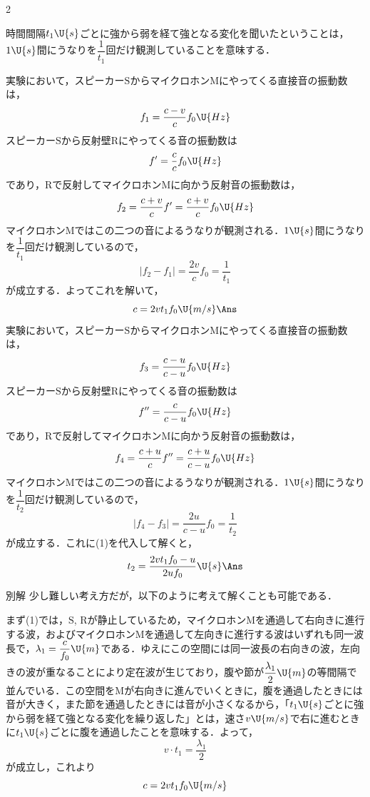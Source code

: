 \begin{multicols}{2}
\begin{sisin}
時間間隔$t_1\U{s}$ごとに強から弱を経て強となる変化を聞いたということは，$1\U{s}$間にうなりを$\dfrac{1}{t_1}$回だけ観測していることを意味する．
\end{sisin}
\KaiHead
\begin{komon}
 実験において，スピーカー$\mathrm{S}$からマイクロホン$\mathrm{M}$にやってくる直接音の振動数は，
       \[f_1=\frac{c-v}{c}f_0\U{Hz}\]
       スピーカー$\mathrm{S}$から反射壁$\mathrm{R}$にやってくる音の振動数は
       \[f^\prime=\frac{c}{c}f_0\U{Hz}\]
       であり，$\mathrm{R}$で反射してマイクロホン$\mathrm{M}$に向かう反射音の振動数は，
       \[f_2=\frac{c+v}{c}f^\prime=\frac{c+v}{c}f_0\U{Hz}\]
       マイクロホン$\mathrm{M}$ではこの二つの音によるうなりが観測される．$1\U{s}$間にうなりを$\dfrac{1}{t_1}$回だけ観測しているので，
       \[|f_2-f_1|=\frac{2v}{c}f_0=\frac{1}{t_1}\]
       が成立する．よってこれを解いて，
       \[c=2vt_1f_0\U{m/s}\Ans\]
 実験において，スピーカー$\mathrm{S}$からマイクロホン$\mathrm{M}$にやってくる直接音の振動数は，
       \[f_3=\frac{c-u}{c-u}f_0\U{Hz}\]
       スピーカー$\mathrm{S}$から反射壁$\mathrm{R}$にやってくる音の振動数は
       \[f^{\prime\prime}=\frac{c}{c-u}f_0\U{Hz}\]
       であり，$\mathrm{R}$で反射してマイクロホン$\mathrm{M}$に向かう反射音の振動数は，
       \[f_4=\frac{c+u}{c}f^{\prime\prime}=\frac{c+u}{c-u}f_0\U{Hz}\]
       マイクロホン$\mathrm{M}$ではこの二つの音によるうなりが観測される．$1\U{s}$間にうなりを$\dfrac{1}{t_2}$回だけ観測しているので，
       \[|f_4-f_3|=\frac{2u}{c-u}f_0=\frac{1}{t_2}\]
       が成立する．これに(1)を代入して解くと，
       \[t_2=\frac{2vt_1f_0-u}{2uf_0}\U{s}\Ans\]
\end{komon}
\begin{bsHosoku}{別解}
少し難しい考え方だが，以下のように考えて解くことも可能である．

まず(1)では，$\mathrm{S}$, $\mathrm{R}$が静止しているため，マイクロホン$\mathrm{M}$を通過して右向きに進行する波，およびマイクロホン$\mathrm{M}$を通過して左向きに進行する波はいずれも同一波長で，$\lambda_1=\dfrac{c}{f_0}\U{m}$である．ゆえにこの空間には同一波長の右向きの波，左向きの波が重なることにより定在波が生じており，腹や節が$\dfrac{\lambda_1}{2}\U{m}$の等間隔で並んでいる．この空間を$\mathrm{M}$が右向きに進んでいくときに，腹を通過したときには音が大きく，また節を通過したときには音が小さくなるから，「$t_1\U{s}$ごとに強から弱を経て強となる変化を繰り返した」とは，速さ$v\U{m/s}$で右に進むときに$t_1\U{s}$ごとに腹を通過したことを意味する．よって，
\[v\cdot t_1=\frac{\lambda_1}{2}\]
が成立し，これより
\[c=2vt_1f_0\U{m/s}\]


\end{bsHosoku}
\end{multicols}
